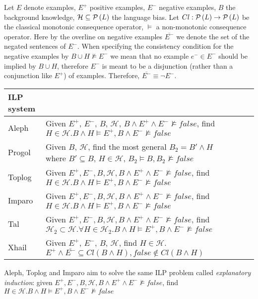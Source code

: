 Let $E$ denote examples, $E^{+}$ positive examples, $E^{-}$ negative examples, $B$ the background knowledge, $\mathcal{H} \subseteq \mathcal{P} \left({ L }\right)$ the language bias. Let $Cl:\mathcal{P} \left({ L }\right) \to \mathcal{P} \left({ L }\right)$ be the classical monotonic consequence operator, $\models$ a non-monotonic consequence operator. Here by the overline on negative examples $\overline{E^{-}}$ we denote the set of the negated sentences of $E^{-}$. When specifying the consistency condition for the negative examples by $B \cup H \not\models E^{-}$ we mean that no example $e^{-} \in E^{-}$ should be implied by $B \cup H$, therefore $E^{-}$ is meant to be a disjunction (rather than a conjunction like $E^{+}$) of examples. Therefore, $\overline{E^{-}} \equiv \neg E^{-}$.

\begin{center}
    \begin{tabular}{ | l | p{15cm} | l | p{5cm} |}
    \hline
    ILP system & \\ \hline
    Aleph & Given $E^{+}$, $E^{-}$, $B$, $\mathcal{H}$, $B \land E^{+} \land E^{-} \not\models false$, find $H \in \mathcal{H}. B \land H \models E^{+}, B \land E^{-} \not\models false$\\ \hline
    Progol & Given $B$, $\mathcal{H}$, find the most general $B_2 = B' \land H$ where $B' \subseteq B$, $H \in \mathcal{H}$, $B_2 \models B, B_2 \not\models false$\\ \hline
    Toplog & Given $E^{+}, E^{-}, B, \mathcal{H}, B \land E^{+} \land E^{-} \not\models false$, find $H \in \mathcal{H}. B \land H \models E^{+}, B \land E^{-} \not\models false$ \\ \hline
    Imparo & Given $E^{+}, E^{-}, B, \mathcal{H}, B \land E^{+} \land E^{-} \not\models false$, find $H \in \mathcal{H}. B \land H \models E^{+}, B \land E^{-} \not\models false$ \\ \hline
    Tal & Given $E^{+}, E^{-}, B, \mathcal{H}, B \land E^{+} \land E^{-} \not\models false$, find $\mathcal{H}_2 \subset \mathcal{H}. \forall H \in \mathcal{H}_2. B \land H \models E^{+}, B \land E^{-} \not\models false$ \\ \hline
    Xhail & Given $E^{+}$, $E^{-}$, $B$, $\mathcal{H}$, find $H \in \mathcal{H}$. $E^{+} \land \overline{E^{-}} \subseteq Cl(B \land H), false \not\in Cl(B \land H)$\\ \hline
    \hline
    \end{tabular}
\end{center}

Aleph, Toplog and Imparo aim to solve the same ILP problem called \emph{explanatory induction}:
given $E^{+}, E^{-}, B, \mathcal{H}, B \land E^{+} \land E^{-} \not\models false$, find $H \in \mathcal{H}. B \land H \models E^{+}, B \land E^{-} \not\models false$

